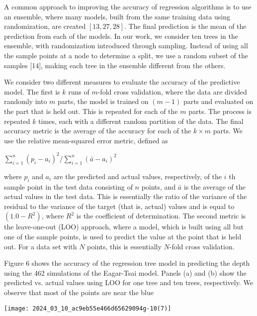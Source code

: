 \documentclass[10pt]{article}
\begin{document}
A common approach to improving the accuracy of regression algorithms is to use an ensemble, where many models, built from the same training data using randomization, are created $[13,27,28]$. The final prediction is the mean of the prediction from each of the models. In our work, we consider ten trees in the ensemble, with randomization introduced through sampling. Instead of using all the sample points at a node to determine a split, we use a random subset of the samples [14], making each tree in the ensemble different from the others.

We consider two different measures to evaluate the accuracy of the predictive model. The first is $k$ runs of $m$-fold cross validation, where the data are divided randomly into $m$ parts, the model is trained on $(m-1)$ parts and evaluated on the part that is held out. This is repeated for each of the $m$ parts. The process is repeated $k$ times, each with a different random partition of the data. The final accuracy metric is the average of the accuracy for each of the $k \times m$ parts. We use the relative mean-squared error metric, defined as

$\sum_{i=1}^{n}\left(p_{i}-a_{i}\right)^{2} / \sum_{i=1}^{n}\left(\bar{a}-a_{i}\right)^{2}$

where $p_{i}$ and $a_{i}$ are the predicted and actual values, respectively, of the $i$ th sample point in the test data consisting of $n$ points, and $\bar{a}$ is the average of the actual values in the test data. This is essentially the ratio of the variance of the residual to the variance of the target (that is, actual) values and is equal to $\left(1.0-R^{2}\right)$, where $R^{2}$ is the coefficient of determination. The second metric is the leave-one-out (LOO) approach, where a model, which is built using all but one of the sample points, is used to predict the value at the point that is held out. For a data set with $N$ points, this is essentially $N$-fold cross validation.

Figure 6 shows the accuracy of the regression tree model in predicting the depth using the 462 simulations of the Eagar-Tsai model. Panels (a) and (b) show the predicted vs. actual values using LOO for one tree and ten trees, respectively. We observe that most of the points are near the blue

\begin{center}
\texttt{[image: 2024\_03\_10\_ac9eb55e466d65629094g-10(7)]}
\end{center}
\end{document}
